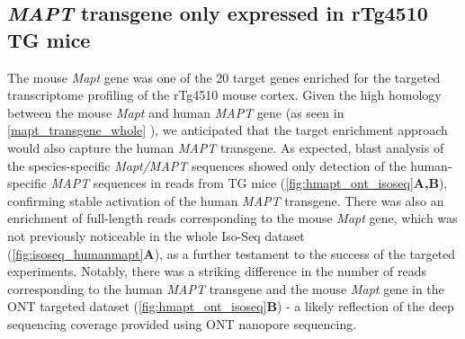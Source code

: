 \newpage
\subsection{\textit{MAPT} transgene only expressed in rTg4510 TG mice}
The mouse \textit{Mapt} gene was one of the 20 target genes enriched for the targeted transcriptome profiling of the rTg4510 mouse cortex. Given the high homology between the mouse \textit{Mapt} and human \textit{MAPT} gene (as seen in \cref{mapt_transgene_whole} ), we anticipated that the target enrichment approach would also capture the human \textit{MAPT} transgene. As expected, blast analysis of the species-specific \textit{Mapt/MAPT} sequences showed only detection of the human-specific \textit{MAPT} sequences in reads from TG mice (\cref{fig:hmapt_ont_isoseq}\textbf{A,B}), confirming stable activation of the human \textit{MAPT} transgene. There was also an enrichment of full-length reads corresponding to the mouse \textit{Mapt} gene, which was not previously noticeable in the whole Iso-Seq dataset (\cref{fig:isoseq_humanmapt}\textbf{A}), as a further testament to the success of the targeted experiments. Notably, there was a striking difference in the number of reads corresponding to the human \textit{MAPT} transgene and the mouse \textit{Mapt} gene in the ONT targeted dataset (\cref{fig:hmapt_ont_isoseq}\textbf{B}) - a likely reflection of the deep sequencing coverage provided using ONT nanopore sequencing. 

